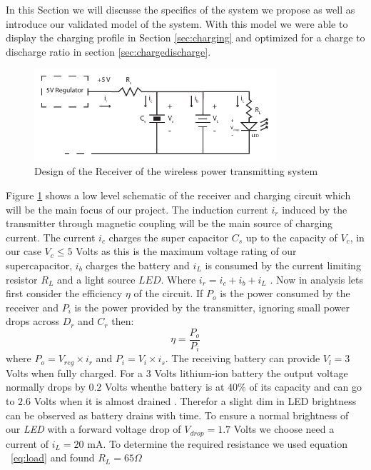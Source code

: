 %
%
In this Section we will discusse the specifics of the system we propose as well as introduce our validated model of the system. With this model we were able to display the charging profile in Section \ref{sec:charging} and optimized for a charge to discharge ratio in section \ref{sec:chargedischarge}.

%
\begin{figure}[h!]
\centering
\includegraphics[width=0.8\textwidth]{rec_design.pdf}
\caption{Design of the Receiver of the wireless power transmitting system}
\label{fig:rec_des}
\end{figure}
%
Figure \ref{fig:rec_des} shows a low level schematic of the receiver and charging circuit which will be the main focus of our project. The induction current $i_r$ induced by the transmitter through magnetic coupling will be the main source of charging current. The current $i_c$ charges the super capacitor $C_s$ up to the capacity of $V_c$, in our case $V_c \leq 5$ Volts as this is the maximum voltage rating of our supercapacitor, $i_b$ charges the battery and $i_L$ is consumed by the current limiting resistor $R_L$  and a light source $LED$. Where $i_r = i_c + i_b +i_L$ . Now in analysis lets first consider the efficiency ${\eta}$ of the circuit. If $P_{o}$ is the power consumed by the receiver and $P_{i}$ is the power provided by the transmitter, ignoring small power drops across $D_r$ and $C_r$  then:
%
\begin{equation}\label{eq:effb}
 {\eta} = \frac{P_o}{P_i}
\end{equation}
%
where $P_o = V_{reg} \times i_r $ and $P_i = V_i \times i_s $. The receiving battery can provide $V_l = 3 $ Volts when fully charged. For a 3 Volts lithium-ion battery the output voltage normally drops by $0.2 $ Volts whenthe  battery is at $40 \%$ of its capacity and can go to $2.6 $ Volts when it is almost drained \cite{IAmp}. Therefor a slight dim in LED brightness can be observed as battery drains with time. To ensure a normal brightness of our \emph{LED} with a forward voltage drop of $V_{drop} = 1.7 $ Volts we choose need a current of $i_L = 20 $ mA. To determine the required resistance we used equation ~\ref{eq:load} and found $R_L = 65 \Omega $

